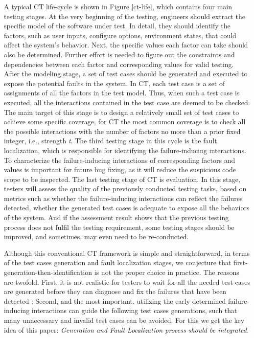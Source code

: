 \documentclass{sig-alternate}
\begin{document}
A typical CT life-cycle is shown in Figure \ref{ct-life}, which contains four main testing stages. At the very beginning of the testing, engineers should extract the specific model of the software under test. In detail, they should identify the factors, such as user inputs, configure options, environment states, that could affect the system's behavior. Next, the specific values each factor can take should also be determined. Further effort is needed to figure out the constraints and dependencies between each factor and corresponding values for valid testing. After the modeling stage, a set of test cases should be generated and executed to expose the potential faults in the system. In CT, each test case is a set of assignments of all the factors in the test model. Thus, when such a test case is executed, all the interactions contained in the test case are deemed to be checked. The main target of this stage is to design a relatively small set of test cases to achieve some specific coverage, for CT the most common coverage is to check all the possible interactions with the number of factors no more than a prior fixed integer, i.e., strength \emph{t}. The third testing stage in this cycle is the fault localization, which is responsible for identifying the failure-inducing interactions. To characterize the failure-inducing interactions of corresponding factors and values is important for future bug fixing, as it will reduce the suspicious code scope to be inspected. The last testing stage of CT is evaluation. In this stage, testers will assess the quality of the previously conducted testing tasks, based on metrics such as whether the failure-inducing interactions can reflect the failures detected, whether the generated test cases is adequate to expose all the behaviors of the system. And if the assessment result shows that the previous testing process does not fulfil the testing requirement, some testing stages should be improved, and sometimes, may even need to be re-conducted.

Although this conventional CT framework is simple and straightforward, in terms of the test cases generation and fault localization stages, we conjecture that first-generation-then-identification is not the proper choice in practice. The reasons are twofold. First, it is not realistic for testers to wait for all the needed test cases are generated before they can diagnose and fix the failures that have been detected \cite{yoo2013fault}; Second, and the most important, utilizing the early determined failure-inducing interactions can guide the following test cases generations, such that many unnecessary and invalid test cases can be avoided. For this we get the key idea of this paper: \emph{Generation and Fault Localization process should be integrated.}
\end{document}

